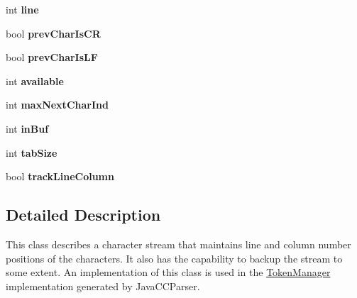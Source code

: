 \begin{DoxyCompactItemize}
\mbox{\label{classvhdl_1_1parser_1_1_char_stream_a1ec713a583a0ff2f32092c39101d14cb}} 
int {\bfseries line}
\item 
\mbox{\label{classvhdl_1_1parser_1_1_char_stream_a3896c04ca5e2e67a6d6d76850c89ef54}} 
bool {\bfseries prev\+Char\+Is\+CR}
\item 
\mbox{\label{classvhdl_1_1parser_1_1_char_stream_ab6180061e753afda80477ce049c9fa64}} 
bool {\bfseries prev\+Char\+Is\+LF}
\item 
\mbox{\label{classvhdl_1_1parser_1_1_char_stream_a26311afec7fdd2e830f9021d93a07857}} 
int {\bfseries available}
\item 
\mbox{\label{classvhdl_1_1parser_1_1_char_stream_a255ae084850ea92b02b420078c283490}} 
int {\bfseries max\+Next\+Char\+Ind}
\item 
\mbox{\label{classvhdl_1_1parser_1_1_char_stream_afc3a2cee410152b326e23831f1f32453}} 
int {\bfseries in\+Buf}
\item 
\mbox{\label{classvhdl_1_1parser_1_1_char_stream_a53d2f0014c25f1bc4f8b94bba8659dec}} 
int {\bfseries tab\+Size}
\item 
\mbox{\label{classvhdl_1_1parser_1_1_char_stream_a0d812351e15796fd8ea5bb48257794a4}} 
bool {\bfseries track\+Line\+Column}
\end{DoxyCompactItemize}


\subsection{Detailed Description}
This class describes a character stream that maintains line and column number positions of the characters. It also has the capability to backup the stream to some extent. An implementation of this class is used in the \mbox{\hyperlink{classvhdl_1_1parser_1_1_token_manager}{Token\+Manager}} implementation generated by Java\+C\+C\+Parser.

